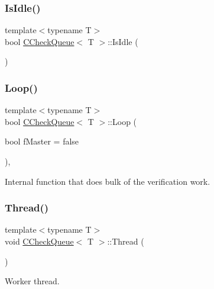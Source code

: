 \subsubsection{\texorpdfstring{Is\+Idle()}{IsIdle()}}
{\footnotesize\ttfamily template$<$typename T$>$ \\
bool \mbox{\hyperlink{class_c_check_queue}{C\+Check\+Queue}}$<$ T $>$\+::Is\+Idle (\begin{DoxyParamCaption}{ }\end{DoxyParamCaption})\hspace{0.3cm}{\ttfamily [inline]}}

\mbox{\label{class_c_check_queue_a20cdd097d93da6deeca6e5721a758165}} 
\subsubsection{\texorpdfstring{Loop()}{Loop()}}
{\footnotesize\ttfamily template$<$typename T$>$ \\
bool \mbox{\hyperlink{class_c_check_queue}{C\+Check\+Queue}}$<$ T $>$\+::Loop (\begin{DoxyParamCaption}\item[{bool}]{f\+Master = {\ttfamily false} }\end{DoxyParamCaption})\hspace{0.3cm}{\ttfamily [inline]}, {\ttfamily [private]}}

Internal function that does bulk of the verification work. \mbox{\label{class_c_check_queue_ad3602cd305b07612e634363b31c1d46c}} 
\subsubsection{\texorpdfstring{Thread()}{Thread()}}
{\footnotesize\ttfamily template$<$typename T$>$ \\
void \mbox{\hyperlink{class_c_check_queue}{C\+Check\+Queue}}$<$ T $>$\+::Thread (\begin{DoxyParamCaption}{ }\end{DoxyParamCaption})\hspace{0.3cm}{\ttfamily [inline]}}



Worker thread. 

